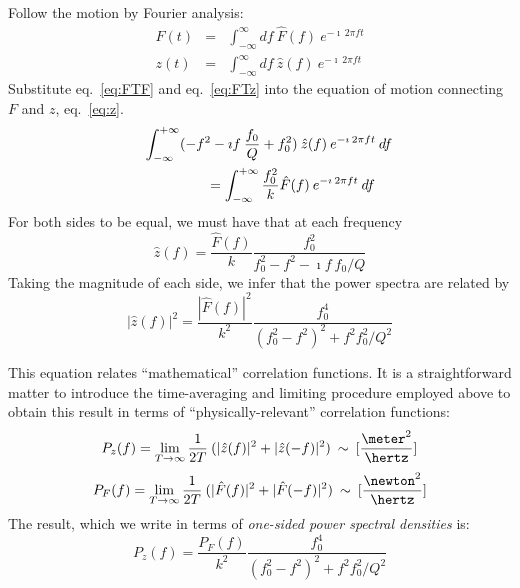 Follow the motion by Fourier analysis:
\begin{eqnarray}
F(t) & = & \int_{-\infty}^{\infty} df \: \hat{F}(f) \: e^{-\imath \: 2 \pi f t} \label{eq:FTF}\\
z(t) & = & \int_{-\infty}^{\infty} df \: \hat{z}(f) \: e^{-\imath \: 2 \pi f t} \label{eq:FTz}
\end{eqnarray}
Substitute eq.~\ref{eq:FTF} and eq.~\ref{eq:FTz} into the equation of
motion connecting $F$ and $z$, eq.~\ref{eq:z}.
\begin{eqnarray*}
\lefteqn{\int_{-\infty}^{+\infty} (-f^2 - \imath f \: \frac{f_0}{Q} + f_0^2 ) \: \hat{z}(f) \: e^{-\imath \: 2 \pi f t} \: df} \\
& & \hspace{0.5in} = \int_{-\infty}^{+\infty} \frac{f_0^2}{k} \hat{F}(f) \: e^{-\imath \: 2 \pi f t} \: df
\end{eqnarray*}
For both sides to be equal, we must have that at each frequency
\begin{equation}
\hat{z}(f) = \frac{\hat{F}(f)}{k} \frac{f_0^2}{f_0^2 - f^2 - \imath f \: f_0 / Q}
\end{equation}
Taking the magnitude of each side, we infer that the power spectra are
related by
\begin{equation}
| \hat{z}(f) |^2 = \frac{| \hat{F}(f) |^2}{k^2} \frac{f_0^4}{(f_0^2 - f^2)^2 + f^2 f_0^2 / Q^2}
\end{equation}

This equation relates ``mathematical'' correlation functions.  It is a
straightforward matter to introduce the time-averaging and limiting
procedure employed above to obtain this result in terms of
``physically-relevant'' correlation functions:  
\begin{equation}
P_z(f) = \lim_{T \rightarrow \infty} \frac{1}{2 T} \: ( | \hat{z}(f) |^{2} + | \hat{z}(-f) |^{2}) \: \sim \: [\frac{\meter^2}{\hertz}]
\end{equation}
\begin{equation}
P_F(f) = \lim_{T \rightarrow \infty} \frac{1}{2 T} \: ( | \hat{F}(f) |^{2} + | \hat{F}(-f) |^{2}) \: \sim \: [\frac{\newton^2}{\hertz}]
\label{eq:PF}
\end{equation}
The result, which we write in terms of \emph{one-sided power spectral
densities} is:
\begin{equation}
P_z(f) = \frac{P_F(f)}{k^2} \frac{f_0^4}{(f_0^2 - f^2)^2 + f^2 f_0^2 / Q^2}
\label{eq:PzPF}
\end{equation}

